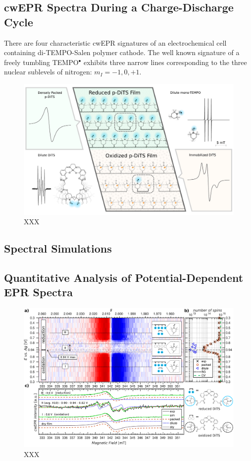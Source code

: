 \subsection{cwEPR Spectra During a Charge-Discharge Cycle}
There are four characteristic cwEPR signatures of an electrochemical cell containing di-TEMPO-Salen polymer cathode. The well known signature of a freely tumbling TEMPO$^{\bullet}$ exhibits three narrow lines corresponding to the three nuclear sublevels of nitrogen: $m_I=-1,0,+1$.
\begin{figure}[h]
\center
	\includegraphics[width=1\textwidth]{./operando_epr/figures/Cartoon_ALL.pdf}
	\caption{XXX}
	\label{fig:cartoon_spectra_dts}
\end{figure}

\subsection{Spectral Simulations}

\subsection{Quantitative Analysis of Potential-Dependent EPR Spectra}
\begin{figure}[h]
\center
	\includegraphics[width=1\textwidth]{./operando_epr/figures/Main_2D_redox_map_full.pdf}
	\caption{XXX}
	\label{fig:operando_carpet}
\end{figure}
